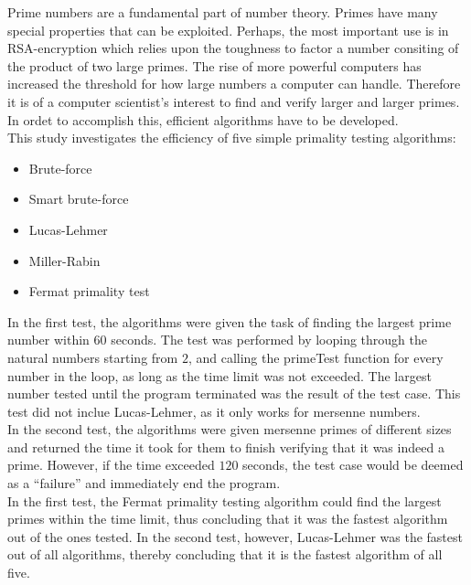 \documentclass[main.tex]{subfiles}
\begin{document}
Prime numbers are a fundamental part of number theory. Primes have many special
properties that can be exploited. Perhaps, the most important use is in
RSA-encryption which relies upon the toughness to factor a number consiting of
the product of two large primes. The rise of more powerful computers has
increased the threshold for how large numbers a computer can handle. Therefore
it is of a computer scientist's interest to find and verify larger and larger
primes. In ordet to accomplish this, efficient algorithms have to be developed. \\

This study investigates the efficiency of five simple primality testing
algorithms:
\begin{itemize}
  \item Brute-force
  \item Smart brute-force
  \item Lucas-Lehmer
  \item Miller-Rabin
  \item Fermat primality test
\end{itemize}

In the first test, the algorithms were given the task of finding the largest
prime number within $60$ seconds. The test was performed by looping through the
natural numbers starting from $2$, and calling the primeTest function for every
number in the loop, as long as the time limit was not exceeded. The largest
number tested until the program terminated was the result of the test case. This
test did not inclue Lucas-Lehmer, as it only works for mersenne numbers. \\

In the second test, the algorithms were given mersenne primes of different sizes
and returned the time it took for them to finish verifying that it was indeed a
prime. However, if the time exceeded $120$ seconds, the test case would be
deemed as a ``failure'' and immediately end the program. \\

In the first test, the Fermat primality testing algorithm could find the largest
primes within the time limit, thus concluding that it was the fastest algorithm
out of the ones tested. In the second test, however, Lucas-Lehmer was the
fastest out of all algorithms, thereby concluding that it is the fastest
algorithm of all five. 
\end{document}
